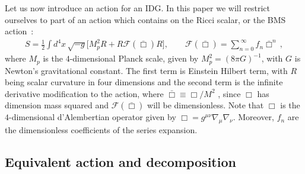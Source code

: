 \documentclass[a4paper,12pt]{article}
\newcommand{\bbox}{\bar{\Box}}
\newcommand{\+}{^{\dagger}}
\newcommand{\2}{\frac{1}{2}}
\newcommand{\3}{\frac{1}{3}}
\newcommand{\4}{\frac{1}{4}}
\newcommand{\6}{\frac{1}{6}}
\newcommand{\8}{\frac{1}{8}}
\begin{document}
Let us now introduce an action for an IDG. In this paper we will restrict ourselves to part of an action 
which contains on the Ricci scalar, or the BMS action~\cite{Biswas:2005qr}:
\begin{eqnarray}\label{eq1}
S=\frac{1}{2}\int d^{4}x \, \sqrt{-g}\bigg[M^{2}_{p}R+R\mathcal{F}(\bbox)R\bigg],\qquad \mathcal{F}(\bbox)=\sum^{\
\infty}_{n=0}f_{n}\bbox^{n}\,,
\end{eqnarray}
where $M_{p}$ is the $4$-dimensional Planck scale, given by $M^{2}_{p}=(8\pi G)^{-1}$, with $G$ is Newton's gravitational constant. The first term is Einstein Hilbert term, with $R$ being scalar curvature in four dimensions and the second term is the infinite derivative modification to the action, where $\bbox\equiv\Box/M^{2}$ ,  since $\Box$ has dimension mass squared and $\mathcal{F}(\bbox)$ will be dimensionless. Note that $\Box$ is the $4$-dimensional d'Alembertian operator given by $\Box=g^{\mu\nu}\nabla_{\mu}\nabla_{\nu}$. Moreover, $f_{n}$ are the dimensionless coefficients of the series expansion. 




\subsection{Equivalent action and decomposition}\label{idgsec}
\end{document}
